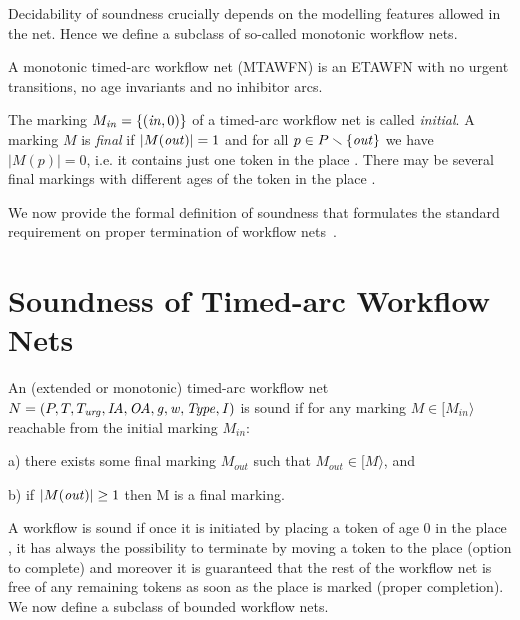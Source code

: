 Decidability of soundness crucially depends on the modelling
features allowed in the net. Hence we define a subclass
of so-called monotonic workflow nets.

\begin{definition} \label{deftawfn}
A monotonic timed-arc workflow net (MTAWFN) is an ETAWFN 
with no urgent transitions, no age invariants and no inhibitor arcs.
\end{definition}

The marking $M_{{\mathit{in}}}=\{(\mathit{in},0)\}$
 of a timed-arc workflow net is called
\emph{initial}. 
A marking $M$ is \emph{final} if 
$|M({\mathit{out}})|= 1$ and for all $p \in P\smallsetminus\{{\mathit{out}}\}$ 
we have $|M(p)|=0$,
i.e. it contains just one token in the place . There may
be several final markings with different ages of the token in the 
place .

We now provide the formal definition of soundness that formulates 
the standard requirement on proper termination of workflow
nets~\cite{Aalst98,AalstHHSVVW11}.

\section{Soundness of Timed-arc Workflow Nets}
\begin{definition} \label{def:soundness}
An (extended or monotonic) timed-arc workflow net $N=(P, T, T_{\mathit{urg}}, \mathit{IA},\allowbreak \mathit{OA}, \mathit{g}, \mathit{w}, \mathit{Type}, \mathit{I})$ is 
sound if for %
any marking $M \in [M_\mathit{in}\rangle$ reachable from the initial
marking $M_\mathit{in}$:
\begin{description}
\item{a)}  there exists some final marking $M_\mathit{out}$ such that 
           $M_\mathit{out} \in [M\rangle$, and 
\item{b)} if $|M({\mathit{out}})|\geq 1$ then M is a final marking.
\end{description}
\end{definition}

A workflow is sound if once it is initiated by placing a token of age $0$ in
the place , it has always the possibility to terminate by moving 
a token to the place  (option to complete)
and moreover it is guaranteed that the rest of the workflow net is free 
of any remaining tokens as soon as the place  is marked 
(proper completion).
We now define a subclass of bounded workflow nets.

